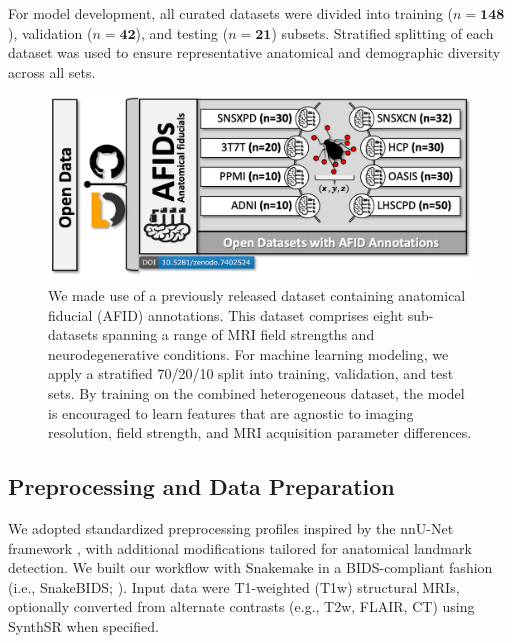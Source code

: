For model development, all curated datasets were divided into training ($n = \textbf{148}$), validation ($n = \textbf{42}$), and testing ($n = \textbf{21}$) subsets. Stratified splitting of each dataset was used to ensure representative anatomical and demographic diversity across all sets.

\begin{figure}[hbt!]
    \centering
    \includegraphics[width=1\linewidth]{figs/ch3_Figure_data.png}
    \caption{We made use of a previously released dataset containing anatomical fiducial (AFID) annotations. This dataset comprises eight sub-datasets spanning a range of MRI field strengths and neurodegenerative conditions. For machine learning modeling, we apply a stratified 70/20/10 split into training, validation, and test sets. By training on the combined heterogeneous dataset, the model is encouraged to learn features that are agnostic to imaging resolution, field strength, and MRI acquisition parameter differences.}
    \label{fig:ch3_Figure_data}
\end{figure}

\subsection{Preprocessing and Data Preparation}

We adopted standardized preprocessing profiles inspired by the nnU-Net framework \cite{Isensee2021-ev}, with additional modifications tailored for anatomical landmark detection. We built our workflow with Snakemake \cite{Koster2012-ok} in a BIDS-compliant fashion (i.e., SnakeBIDS; \cite{Van-Dyken2025-cn}). Input data were T1-weighted (T1w) structural MRIs, optionally converted from alternate contrasts (e.g., T2w, FLAIR, CT) using SynthSR \cite{Iglesias2023-co} when specified. 

